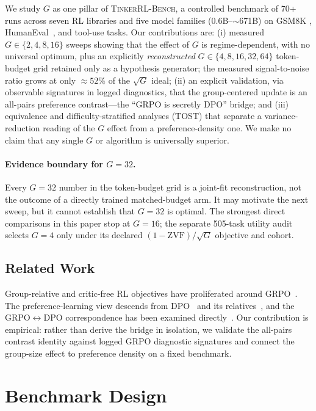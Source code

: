 \documentclass{article}
\newcommand{\ours}{\textsc{TinkerRL-Bench}}
\begin{document}
We study $G$ as one pillar of \ours{}, a controlled benchmark of 70+ runs across
seven RL libraries and five model families ($0.6$B--$\sim$671B) on GSM8K
\citep{cobbe2021training}, HumanEval~\citep{chen2021codex}, and tool-use tasks. Our
contributions are: (i) measured $G\in\{2,4,8,16\}$ sweeps showing that the effect
of $G$ is regime-dependent, with no universal optimum, plus an explicitly
\emph{reconstructed} $G\in\{4,8,16,32,64\}$ token-budget grid retained only as a
hypothesis generator; the measured signal-to-noise ratio grows at only
$\approx 52\%$ of the $\sqrt{G}$ ideal;
(ii) an explicit validation, via observable signatures in logged diagnostics, that the group-centered
update is an all-pairs preference contrast---the ``GRPO is secretly DPO'' bridge;
and (iii) equivalence and difficulty-stratified analyses (TOST) that separate a
variance-reduction reading of the $G$ effect from a preference-density one. We make
no claim that any single $G$ or algorithm is universally superior.

\paragraph{Evidence boundary for $G{=}32$.}
Every $G{=}32$ number in the token-budget grid is a joint-fit reconstruction,
not the outcome of a directly trained matched-budget arm. It may motivate the
next sweep, but it cannot establish that $G{=}32$ is optimal. The strongest
direct comparisons in this paper stop at $G{=}16$; the separate 505-task
utility audit selects $G{=}4$ only under its declared
$(1-\mathrm{ZVF})/\sqrt{G}$ objective and cohort.

\subsection{Related Work}
\label{sec:p3-related}
Group-relative and critic-free RL objectives have proliferated around
GRPO~\citep{shao2024deepseekmath, ahmadian2024backtobasics, lin2025cppo, gift2025}.
The preference-learning view descends from
DPO~\citep{rafailov2024direct} and its relatives~\citep{azar2024ipo, ethayarajh2024kto, hong2024orpo}, and the GRPO$\leftrightarrow$DPO correspondence has been examined
directly~\citep{wu2025grpo_dpo, liu2026gdpo}. Our contribution is empirical: rather
than derive the bridge in isolation, we validate the all-pairs contrast identity
against logged GRPO diagnostic signatures and connect the group-size effect to preference
density on a fixed benchmark.
 \section{Benchmark Design}
\label{sec:benchmark}
\end{document}
